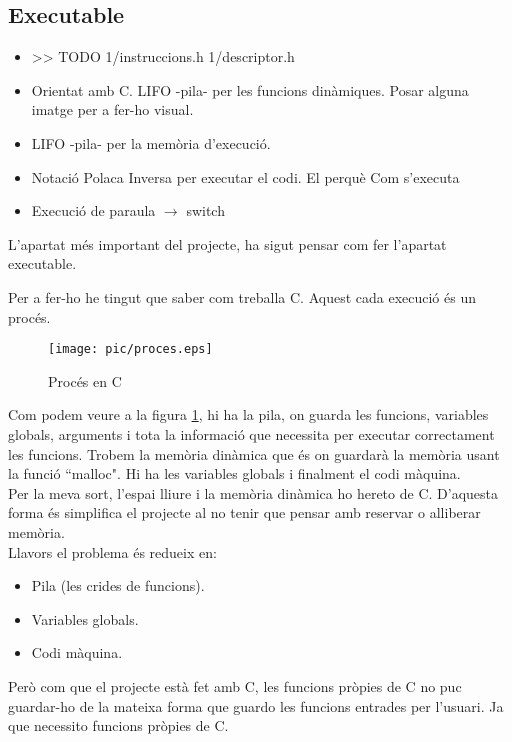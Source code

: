 \subsection{Executable}

{\color{blue}
\begin{itemize}
    \item >> TODO 1/instruccions.h  1/descriptor.h
    \item Orientat amb C.
        \subitem LIFO -pila- per les funcions dinàmiques.
        \subitem Posar alguna imatge per a fer-ho visual.
    \item LIFO -pila- per la memòria d'execució.
    \item Notació Polaca Inversa per executar el codi.
        \subitem El perquè
        \subitem Com s'executa
    \item Execució de paraula $\to$ switch
\end{itemize}
}
L'apartat més important del projecte,
ha sigut pensar com fer l'apartat executable.

Per a fer-ho he tingut que saber com treballa C.
Aquest cada execució és un procés.
\begin{figure}[!ht]
    \centering
    \texttt{[image: pic/proces.eps]}
    \caption{Procés en C}
    \label{fig:proces}
\end{figure}
Com podem veure a la figura \ref{fig:proces},
hi ha la pila,
on guarda les funcions, variables globals, arguments i
tota la informació que necessita per executar correctament les funcions.
Trobem la memòria dinàmica que és on guardarà la memòria usant la funció ``malloc".
Hi ha les variables globals i finalment el codi màquina.\\

Per la meva sort, l'espai lliure i la memòria dinàmica ho hereto de C.
D'aquesta forma és simplifica el projecte al no tenir que pensar amb reservar o alliberar memòria.\\

Llavors el problema és redueix en:
\begin{itemize}
    \item Pila (les crides de funcions).
    \item Variables globals.
    \item Codi màquina.
\end{itemize}

Però com que el projecte està fet amb C, les funcions pròpies de C
no puc guardar-ho de la mateixa forma que guardo les funcions entrades
per l'usuari. Ja que necessito funcions pròpies de C.

